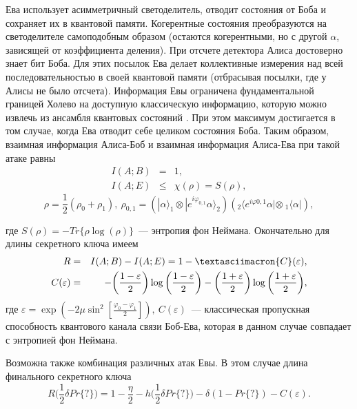 Ева использует асимметричный светоделитель, отводит состояния от Боба и сохраняет их в квантовой памяти. Когерентные состояния преобразуются на светоделителе самоподобным образом (остаются когерентными, но с другой $\alpha$, зависящей от коэффициента деления). 
При отсчете детектора Алиса достоверно знает бит Боба. Для этих посылок Ева делает коллективные измерения над всей последовательностью в своей квантовой памяти (отбрасывая посылки, где у Алисы не было отсчета).
Информация Евы ограничена фундаментальной границей Холево на доступную классическую информацию, которую можно извлечь из ансамбля квантовых состояний \cite{holevo2002Introtoquathe}. При этом максимум достигается в том случае, когда Ева отводит себе целиком состояния Боба. Таким образом, взаимная информация Алиса-Боб и взаимная информация Алиса-Ева при такой атаке равны
\begin{eqnarray*}
  I(A;B) &=& 1, \\
  I(A;E) &\leq& \chi(\rho) = S(\rho),  
\end{eqnarray*}
\begin{equation*}
  \rho = \frac{1}{2}(\rho_0 + \rho_1),~
  \rho_{0,1} = (|\alpha \rangle_1 \otimes | e^{i\varphi_{0,1}}\alpha\rangle_2)
	      ({}_2\langle e^{i\varphi{0,1}}\alpha | \otimes~{}_1 \langle \alpha |),
\end{equation*}

где $S(\rho) = -Tr\{\rho \log (\rho)\}$~--- энтропия фон Неймана.
Окончательно для длины секретного ключа имеем
\begin{eqnarray*}
  R &=& I(A;B) - I(A;E) = 1 - \textasciimacron{C}(\varepsilon),\\  
  C(\varepsilon) &=& -\bigg(\frac{1-\varepsilon}{2}\bigg)\log\bigg(\frac{1-\varepsilon}{2}\bigg) - \bigg(\frac{1+\varepsilon}{2}\bigg)\log\bigg(\frac{1+\varepsilon}{2}\bigg),
\end{eqnarray*}
где $\varepsilon = \exp(-2\mu\sin^2[\frac{\varphi_0 - \varphi_1}{2}]),~C(\varepsilon)$~--- классическая пропускная способность квантового канала связи Боб-Ева, которая в данном случае совпадает с энтропией фон Неймана.

Возможна также комбинация различных атак Евы. В этом случае длина финального секретного ключа
\begin{equation*}
  R\bigg(\frac{1}{2}\delta Pr\{?\}\bigg) = 1 - \frac{\eta}{2} - h\bigg(\frac{1}{2}\delta Pr\{?\}\bigg) - \delta(1 - Pr\{?\}) - C(\varepsilon).
\end{equation*}

